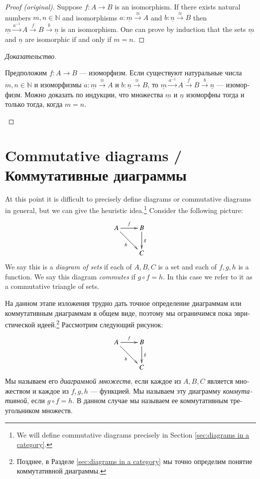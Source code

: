 \documentclass[a4paper]{book}
\def\NN{{\mathbb N}}
\def\to{\rightarrow}
\def\taking{\colon}
\def\iso{\cong}
\def\m1{{-1}}
\def\ul{\underline}
\newcommand{\To}[1]{\xrightarrow{#1}}
\def\Set{{\bf Set}}
\theoremstyle{myth}
\newenvironment{proofENG}{\begin{proof}[Proof (original)]}{\end{proof}}
\newenvironment{proofRUS}{\begin{proof}[Доказательство]}{\end{proof}}
\begin{document}
\begin{english}
\begin{proofENG}
Suppose $f\taking A\to B$ is an isomorphism. If there exists natural numbers $m,n\in\NN$ and isomorphisms $a\taking\ul{m}\To\iso A$ and $b\taking\ul{n}\To\iso B$ then $\ul{m}\To{a^\m1}A\To{f}B\To{b}\ul{n}$ is an isomorphism. One can prove by induction that the sets $\ul{m}$ and $\ul{n}$ are isomorphic if and only if $m=n$. 
\end{proofENG}

\begin{proofRUS}
\begin{russian}
Предположим $f\taking A\to B$ — изоморфизм. Если существуют натуральные числа $m,n\in\NN$ и изоморфизмы $a\taking\ul{m}\To\iso A$ и $b\taking\ul{n}\To\iso B$, то $\ul{m}\To{a^\m1}A\To{f}B\To{b}\ul{n}$ — изоморфизм. Можно доказать по индукции, что множества $\ul{m}$ и $\ul{n}$ изоморфны тогда и только тогда, когда $m=n$. 
\end{russian}
\end{proofRUS}


\section{Commutative diagrams / Коммутативные диаграммы}\label{sec:comm diag}
\addtocounter{subsection}{1}\setcounter{subsubsection}{0}

At this point it is difficult to precisely define diagrams or commutative diagrams in general, but we can give the heuristic idea.\footnote{We will define commutative diagrams precisely in Section \ref{sec:diagrams in a category}.}
Consider the following picture: 
\begin{align}\label{dia:triangle}
\xymatrix{A\ar[r]^f\ar[rd]_h&B\ar[d]^g\\&C}
\end{align}
We say this is a {\em diagram of sets}\index{diagram!in $\Set$} if each of $A,B,C$ is a set and each of $f,g,h$ is a function. We say this diagram {\em commutes} if $g\circ f = h$. In this case we refer to it as a commutative triangle of sets.

\begin{russian} 
На данном этапе изложения трудно дать точное определение диаграммам или коммутативным диаграммам в общем виде, поэтому мы ограничимся пока эвристической идеей.\footnote{Позднее, в Разделе \ref{sec:diagrams in a category} мы точно определим понятие коммутативной диаграммы.}
Рассмотрим следующий рисунок: 
\begin{align}\label{dia:triangle}
\xymatrix{A\ar[r]^f\ar[rd]_h&B\ar[d]^g\\&C}
\end{align}
Мы называем его {\em диаграммой множеств}\index{diagram!in $\Set$}, если каждое из $A,B,C$ является множеством и каждое из $f,g,h$ — функцией. Мы называем эту диаграмму {\em коммутативной}, если $g\circ f = h$. В данном случае мы называем ее коммутативным треугольником множеств.
\end{russian}


\end{english}
\end{document}
